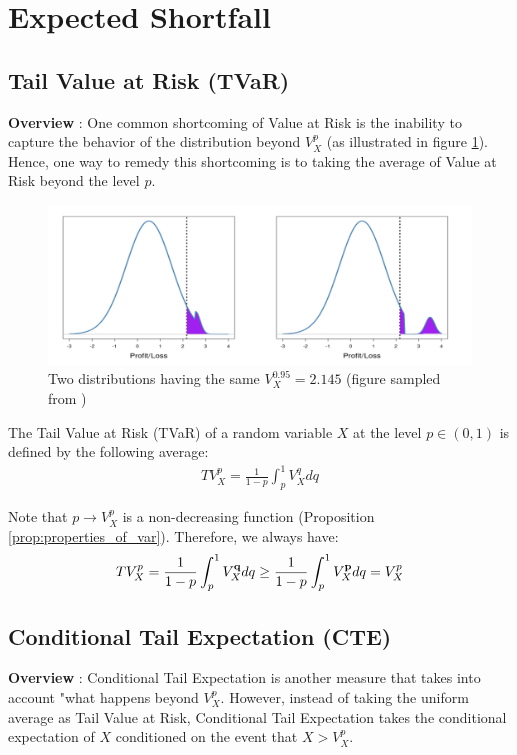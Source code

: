 \newpage
\section{Expected Shortfall}
\subsection{Tail Value at Risk (TVaR)}
\textbf{Overview} : One common shortcoming of Value at Risk is the inability to capture the behavior of the distribution beyond $V_X^p$ (as illustrated in figure \ref{fig:var-shortcoming}). Hence, one way to remedy this shortcoming is to taking the average of Value at Risk beyond the level $p$.
\begin{figure}[ht]
    \centering
    \includegraphics[width=\textwidth]{figures/var_shortcoming.png}
    \caption{Two distributions having the same $V_X^{0.95} = 2.145$ (figure sampled from \cite{book:privault})}
    \label{fig:var-shortcoming}
\end{figure}

\begin{definition}
    The Tail Value at Risk (TVaR) of a random variable $X$ at the level $p\in(0,1)$ is defined by the following average:
    \begin{align*}
        \boxed{
            TV_X^p = \frac{1}{1-p} \int_p^1 V_X^qdq
        }
    \end{align*}

    \noindent Note that $p \to V_X^p$ is a non-decreasing function (Proposition \ref{prop:properties_of_var}). Therefore, we always have:
    \begin{align*}
        TV_X^p = \frac{1}{1-p}\int_p^1 V_X^{\bf q}dq \ge \frac{1}{1-p}\int_p^1 V_X^{\bf p}dq = V_X^p
    \end{align*}
\end{definition}

\subsection{Conditional Tail Expectation (CTE)}
\textbf{Overview} : Conditional Tail Expectation is another measure that takes into account "what happens beyond $V_X^p$. However, instead of taking the uniform average as Tail Value at Risk, Conditional Tail Expectation takes the conditional expectation of $X$ conditioned on the event that $X > V_X^p$.

